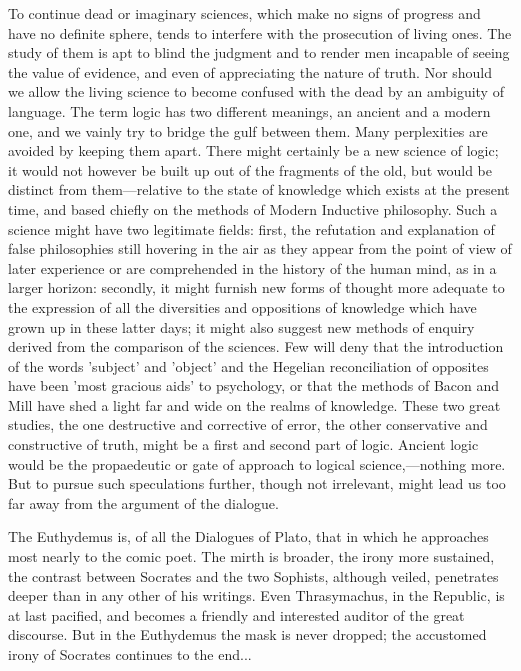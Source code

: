 \documentclass[11pt,letter]{article}
\begin{document}
\par  To continue dead or imaginary sciences, which make no signs of progress and have no definite sphere, tends to interfere with the prosecution of living ones. The study of them is apt to blind the judgment and to render men incapable of seeing the value of evidence, and even of appreciating the nature of truth. Nor should we allow the living science to become confused with the dead by an ambiguity of language. The term logic has two different meanings, an ancient and a modern one, and we vainly try to bridge the gulf between them. Many perplexities are avoided by keeping them apart. There might certainly be a new science of logic; it would not however be built up out of the fragments of the old, but would be distinct from them—relative to the state of knowledge which exists at the present time, and based chiefly on the methods of Modern Inductive philosophy. Such a science might have two legitimate fields: first, the refutation and explanation of false philosophies still hovering in the air as they appear from the point of view of later experience or are comprehended in the history of the human mind, as in a larger horizon: secondly, it might furnish new forms of thought more adequate to the expression of all the diversities and oppositions of knowledge which have grown up in these latter days; it might also suggest new methods of enquiry derived from the comparison of the sciences. Few will deny that the introduction of the words 'subject' and 'object' and the Hegelian reconciliation of opposites have been 'most gracious aids' to psychology, or that the methods of Bacon and Mill have shed a light far and wide on the realms of knowledge. These two great studies, the one destructive and corrective of error, the other conservative and constructive of truth, might be a first and second part of logic. Ancient logic would be the propaedeutic or gate of approach to logical science,—nothing more. But to pursue such speculations further, though not irrelevant, might lead us too far away from the argument of the dialogue.

\par  The Euthydemus is, of all the Dialogues of Plato, that in which he approaches most nearly to the comic poet. The mirth is broader, the irony more sustained, the contrast between Socrates and the two Sophists, although veiled, penetrates deeper than in any other of his writings. Even Thrasymachus, in the Republic, is at last pacified, and becomes a friendly and interested auditor of the great discourse. But in the Euthydemus the mask is never dropped; the accustomed irony of Socrates continues to the end...
\end{document}
